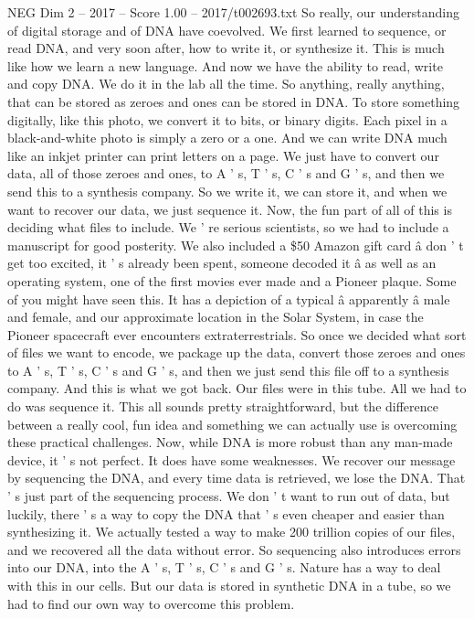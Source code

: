 \begin{textsample}{NEG Dim 2 – 2017 – Score 1.00 – 2017/t002693.txt}
So really, our understanding of digital storage and of DNA have coevolved.
We first learned to sequence, or read DNA, and very soon after, how to write it, or synthesize it.
This is much like how we learn a new language.
And now we have the ability to read, write and copy DNA.
We do it in the lab all the time.
So anything, really anything, that can be stored as zeroes and ones can be stored in DNA.
To store something digitally, like this photo, we convert it to bits, or binary digits.
Each pixel in a black-and-white photo is simply a zero or a one.
And we can write DNA much like an inkjet printer can print letters on a page.
We just have to convert our data, all of those zeroes and ones, to A ' s, T ' s, C ' s and G ' s, and then we send this to a synthesis company.
So we write it, we can store it, and when we want to recover our data, we just sequence it.
Now, the fun part of all of this is deciding what files to include.
We ' re serious scientists, so we had to include a manuscript for good posterity.
We also included a \$50 Amazon gift card â don ' t get too excited, it ' s already been spent, someone decoded it â as well as an operating system, one of the first movies ever made and a Pioneer plaque.
Some of you might have seen this.
It has a depiction of a typical â apparently â male and female, and our approximate location in the Solar System, in case the Pioneer spacecraft ever encounters extraterrestrials.
So once we decided what sort of files we want to encode, we package up the data, convert those zeroes and ones to A ' s, T ' s, C ' s and G ' s, and then we just send this file off to a synthesis company.
And this is what we got back.
Our files were in this tube.
All we had to do was sequence it.
This all sounds pretty straightforward, but the difference between a really cool, fun idea and something we can actually use is overcoming these practical challenges.
Now, while DNA is more robust than any man-made device, it ' s not perfect.
It does have some weaknesses.
We recover our message by sequencing the DNA, and every time data is retrieved, we lose the DNA.
That ' s just part of the sequencing process.
We don ' t want to run out of data, but luckily, there ' s a way to copy the DNA that ' s even cheaper and easier than synthesizing it.
We actually tested a way to make 200 trillion copies of our files, and we recovered all the data without error.
So sequencing also introduces errors into our DNA, into the A ' s, T ' s, C ' s and G ' s.
Nature has a way to deal with this in our cells.
But our data is stored in synthetic DNA in a tube, so we had to find our own way to overcome this problem.

\end{textsample}
